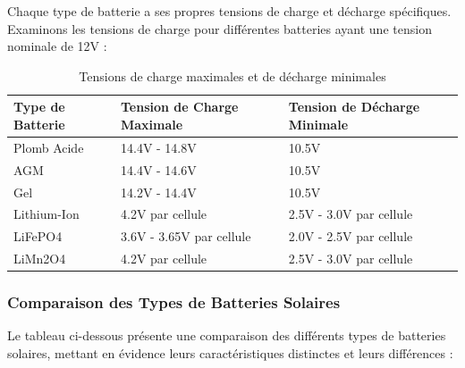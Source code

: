 Chaque type de batterie a ses propres tensions de charge et décharge spécifiques. Examinons les tensions de charge pour différentes batteries ayant une tension nominale de 12V :


\begin{table}[h!]
	\centering
	\begin{tabular}{|>{\centering\arraybackslash}m{5cm}|>{\centering\arraybackslash}m{5cm}|>{\centering\arraybackslash}m{5cm}|}
		\hline
			\rule[0.5cm]{0cm}{0cm}\textbf{Type de Batterie} &	\rule[0.5cm]{0cm}{0cm} \textbf{Tension de Charge Maximale} & \textbf{Tension de Décharge Minimale} \\ \hline

			\rule[0.5cm]{0cm}{0cm}\quad  Plomb Acide  & 14.4V - 14.8V & 10.5V \\ \hline
			\rule[0.5cm]{0cm}{0cm}\quad  AGM  & 14.4V - 14.6V & 10.5V \\ \hline
			\rule[0.5cm]{0cm}{0cm}\quad   Gel & 14.2V - 14.4V & 10.5V \\ \hline
	
		\rule[0.5cm]{0cm}{0cm}	\quad  Lithium-Ion & 4.2V par cellule & 2.5V - 3.0V par cellule \\ \hline
		\rule[0.5cm]{0cm}{0cm}	\quad  LiFePO4 & 3.6V - 3.65V par cellule & 2.0V - 2.5V par cellule \\ \hline
			\rule[0.5cm]{0cm}{0cm}\quad  LiMn2O4 & 4.2V par cellule & 2.5V - 3.0V par cellule \\ \hline
	\end{tabular}
	\caption{Tensions de charge maximales et de décharge minimales}
\end{table}



\subsubsection{Comparaison des Types de Batteries Solaires}

Le tableau ci-dessous présente une comparaison des différents types de batteries solaires, mettant en évidence leurs caractéristiques distinctes et leurs différences :

